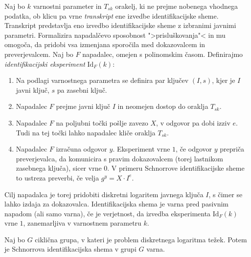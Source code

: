\begin{definicija}
\label{def:id-sec}
    Naj bo $k$ varnostni parameter in $T_{sk}$ orakelj, ki ne prejme nobenega vhodnega podatka, ob klicu
    pa vrne \textit{transkript} ene izvedbe identifikacijske sheme. Transkript predstavlja eno izvedbo
    identifikacijske sheme z izbranimi javnimi parametri. Formalizira napadalčevo sposobnost
    ">prisluškovanja"< in mu omogoča, da pridobi vsa izmenjana sporočila med dokazovalcem in
    preverjevalcem. Naj bo $F$ napadalec, omejen s polinomskim časom. Definirajmo 
    \textit{identifikacijski eksperiment} $\text{Id}_F(k)$:
    \begin{enumerate}
        \item Na podlagi varnostnega parametra se definira par ključev $(I, s)$, kjer je $I$
            javni ključ, $s$ pa zasebni ključ.
        \item Napadalec $F$ prejme javni ključ $I$ in neomejen dostop do oraklja $T_{sk}$.
        \item Napadalec $F$ na poljubni točki pošlje zavezo $X$, v odgovor pa dobi izziv $e$. Tudi
            na tej točki lahko napadalec kliče oraklja $T_{sk}$.
        \item Napadalec $F$ izračuna odgovor $y$. Eksperiment vrne $1$, če odgovor $y$ prepriča
            preverjevalca, da komunicira s pravim dokazovalcem (torej lastnikom zasebnega ključa),
            sicer vrne $0$. V primeru Schnorrove identifikacijske sheme to ustreza preverbi, če
            velja $g^y = X \cdot I^e$.
    \end{enumerate}
    Cilj napadalca je torej pridobiti diskretni logaritem javnega ključa $I$, s čimer se lahko izdaja
    za dokazovalca. Identifikacijska shema je varna pred pasivnim napadom (ali samo varna), če je
    verjetnost, da izvedba eksperimenta $\text{Id}_F(k)$ vrne $1$, zanemarljiva v varnostnem
    parametru $k$.
\end{definicija}

\begin{izrek}
\label{izrek:schnorr-id-sec}
    Naj bo $G$ ciklična grupa, v kateri je problem diskretnega logaritma težek. Potem je Schnorrova
    identifikacijska shema v grupi $G$ varna.
\end{izrek}

